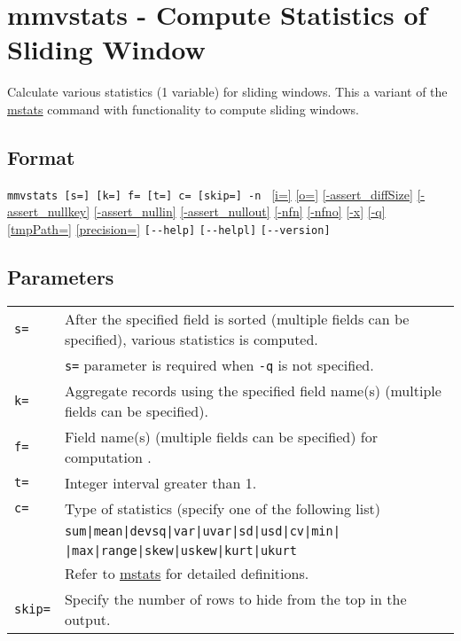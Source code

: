 
%

\section{mmvstats - Compute Statistics of Sliding Window\label{sect:mmvstats}}

Calculate various statistics (1 variable) for sliding windows. This a variant of the \hyperref[sect:mstats]{mstats} command with functionality to compute sliding windows. 


\subsection*{Format}
\verb|mmvstats [s=] [k=] f= [t=] c= [skip=] -n |
\hyperref[sect:option_i]{[i=]}
\hyperref[sect:option_o]{[o=]}
\hyperref[sect:option_assert_diffSize]{[-assert\_diffSize]}
\hyperref[sect:option_assert_nullkey]{[-assert\_nullkey]}
\hyperref[sect:option_assert_nullin]{[-assert\_nullin]}
\hyperref[sect:option_assert_nullout]{[-assert\_nullout]}
\hyperref[sect:option_nfn]{[-nfn]} 
\hyperref[sect:option_nfno]{[-nfno]}  
\hyperref[sect:option_x]{[-x]}
\hyperref[sect:option_q]{[-q]}
\hyperref[sect:option_option_tmppath]{[tmpPath=]}
\hyperref[sect:option_precision]{[precision=]}
\verb|[--help]|
\verb|[--helpl]|
\verb|[--version]|\\

\subsection*{Parameters}
\begin{table}[htbp]
{\small
\begin{tabular}{ll}
\verb|s=|    & After the specified field is sorted (multiple fields can be specified), various statistics is computed. \\
             & \verb|s=| parameter is required when \verb|-q| is not specified. \\
\verb|k=|    & Aggregate records using the specified field name(s) (multiple fields can be specified). \\

\verb|f=|    & Field name(s) (multiple fields can be specified) for computation . \\
\verb|t=|    & Integer interval greater than 1.  \\
\verb|c=|    & Type of statistics (specify one of the following list)\\
             & \verb/sum|mean|devsq|var|uvar|sd|usd|cv|min|/\\
             & \verb/|max|range|skew|uskew|kurt|ukurt/\\
             & Refer to \hyperref[sect:mstats]{mstats} for detailed definitions. \\
\verb|skip=| & Specify the number of rows to hide from the top in the output. \\
\end{tabular} 
}
\end{table} 


